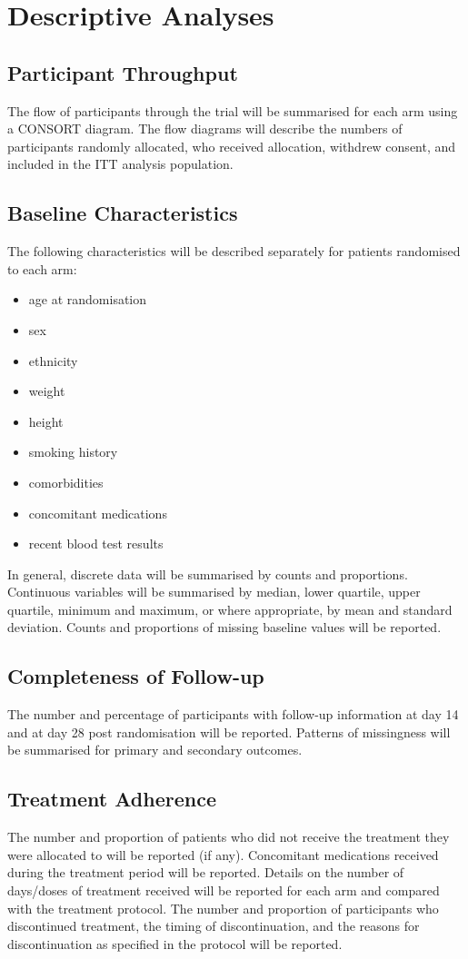 \documentclass[11pt,parskip=half-]{scrartcl}
\begin{document}
\clearpage

\section{Descriptive Analyses}

\subsection{Participant Throughput}
The flow of participants through the trial will be summarised for each arm using a CONSORT diagram. The flow diagrams will describe the numbers of participants randomly allocated, who received allocation, withdrew consent, and included in the ITT analysis population.

\subsection{Baseline Characteristics}
The following characteristics will be described separately for patients randomised to each arm:
\begin{itemize}
    \item age at randomisation
    \item sex
    \item ethnicity
    \item weight
    \item height
    \item smoking history
    \item comorbidities
    \item concomitant medications
    \item recent blood test results
\end{itemize}
In general, discrete data will be summarised by counts and proportions. Continuous variables will be summarised by median, lower quartile, upper quartile, minimum and maximum, or where appropriate, by mean and standard deviation. Counts and proportions of missing baseline values will be reported.

\subsection{Completeness of Follow-up}
The number and percentage of participants with follow-up information at day 14 and at day 28 post randomisation will be reported. Patterns of missingness will be summarised for primary and secondary outcomes.

\subsection{Treatment Adherence}
The number and proportion of patients who did not receive the treatment they were allocated to will be reported (if any). Concomitant medications received during the treatment period will be reported. Details on the number of days/doses of treatment received will be reported for each arm and compared with the treatment protocol. The number and proportion of participants who discontinued treatment, the timing of discontinuation, and the reasons for discontinuation as specified in the protocol will be reported.
\end{document}
